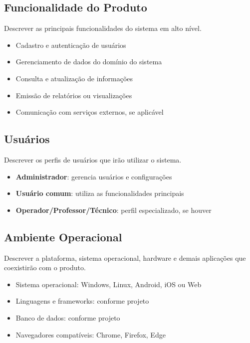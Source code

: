 \documentclass[12pt,a4paper]{article}
\begin{document}
\subsection{Funcionalidade do Produto}
Descrever as principais funcionalidades do sistema em alto nível.

\begin{itemize}[leftmargin=1.2cm]
    \item Cadastro e autenticação de usuários
    \item Gerenciamento de dados do domínio do sistema
    \item Consulta e atualização de informações
    \item Emissão de relatórios ou visualizações
    \item Comunicação com serviços externos, se aplicável
\end{itemize}

\subsection{Usuários}
Descrever os perfis de usuários que irão utilizar o sistema.

\begin{itemize}[leftmargin=1.2cm]
    \item \textbf{Administrador}: gerencia usuários e configurações
    \item \textbf{Usuário comum}: utiliza as funcionalidades principais
    \item \textbf{Operador/Professor/Técnico}: perfil especializado, se houver
\end{itemize}

\subsection{Ambiente Operacional}
Descrever a plataforma, sistema operacional, hardware e demais aplicações que coexistirão com o produto.

\begin{itemize}[leftmargin=1.2cm]
    \item Sistema operacional: Windows, Linux, Android, iOS ou Web
    \item Linguagens e frameworks: conforme projeto
    \item Banco de dados: conforme projeto
    \item Navegadores compatíveis: Chrome, Firefox, Edge
\end{itemize}
\end{document}
